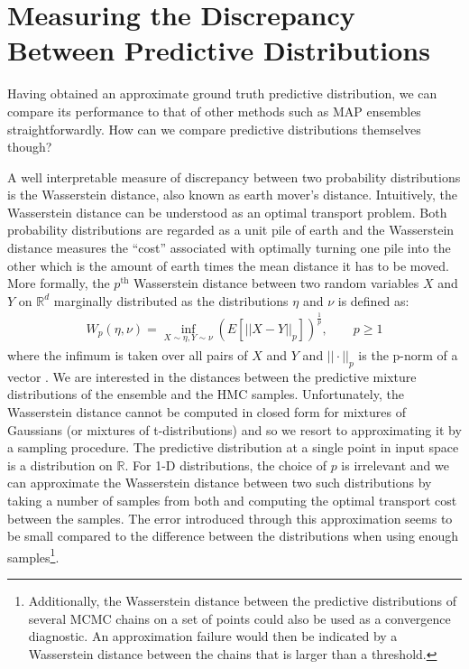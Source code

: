 \documentclass[../thesis.tex]{subfiles}
\begin{document}
\section{Measuring the Discrepancy Between Predictive Distributions}
Having obtained an approximate ground truth predictive distribution, we can compare its performance to that of other methods such as MAP ensembles straightforwardly. How can we compare predictive distributions themselves though?

A well interpretable measure of discrepancy between two probability distributions is the Wasserstein distance, also known as earth mover's distance. Intuitively, the Wasserstein distance can be understood as an optimal transport problem. Both probability distributions are regarded as a unit pile of earth and the Wasserstein distance measures the ``cost'' associated with optimally turning one pile into the other which is the amount of earth times the mean distance it has to be moved. More formally, the $p^\text{th}$ Wasserstein distance between two random variables $X$ and $Y$ on $\mathbb{R}^d$ marginally distributed as the distributions $\eta$ and $\nu$ is defined as:
\begin{equation}
    \begin{split}
        W_p(\eta, \nu) = \inf_{X\sim \eta, Y\sim \nu} (E[||X - Y||_p])^{\frac{1}{p}}, \hspace{2em} p \ge 1
    \end{split}
\end{equation}
where the infimum is taken over all pairs of $X$ and $Y$ and $|| \cdot ||_p$ is the p-norm of a vector \parencite{panaretos2019statistical}. We are interested in the distances between the predictive mixture distributions of the ensemble and the HMC samples. Unfortunately, the Wasserstein distance cannot be computed in closed form for mixtures of Gaussians (or mixtures of t-distributions) and so we resort to approximating it by a sampling procedure. The predictive distribution at a single point in input space is a distribution on $\mathbb{R}$. For 1-D distributions, the choice of $p$ is irrelevant and we can approximate the Wasserstein distance between two such distributions by taking a number of samples from both and computing the optimal transport cost between the samples. The error introduced through this approximation seems to be small compared to the difference between the distributions when using enough samples\footnote{Additionally, the Wasserstein distance between the predictive distributions of several MCMC chains on a set of points could also be used as a convergence diagnostic. An approximation failure would then be indicated by a Wasserstein distance between the chains that is larger than a threshold.}. 
\end{document}
